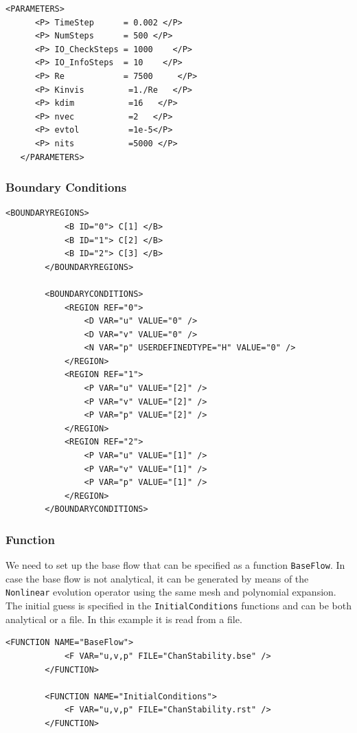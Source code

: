     \begin{lstlisting}[style=XMLStyle]
<PARAMETERS>
      <P> TimeStep      = 0.002 </P>
      <P> NumSteps      = 500 </P>
      <P> IO_CheckSteps = 1000    </P>
      <P> IO_InfoSteps  = 10    </P>
      <P> Re            = 7500     </P>
      <P> Kinvis         =1./Re   </P>
      <P> kdim           =16   </P>
      <P> nvec           =2   </P>
      <P> evtol          =1e-5</P>
      <P> nits           =5000 </P>
   </PARAMETERS>
         \end{lstlisting}


\subsubsection{Boundary Conditions}

    \begin{lstlisting}[style=XMLStyle]
 <BOUNDARYREGIONS>
            <B ID="0"> C[1] </B>
            <B ID="1"> C[2] </B>
            <B ID="2"> C[3] </B>
        </BOUNDARYREGIONS>

        <BOUNDARYCONDITIONS>
            <REGION REF="0">
                <D VAR="u" VALUE="0" />
                <D VAR="v" VALUE="0" />
                <N VAR="p" USERDEFINEDTYPE="H" VALUE="0" />
            </REGION>
            <REGION REF="1">
                <P VAR="u" VALUE="[2]" />
                <P VAR="v" VALUE="[2]" />
                <P VAR="p" VALUE="[2]" />
            </REGION>
            <REGION REF="2">
                <P VAR="u" VALUE="[1]" />
                <P VAR="v" VALUE="[1]" />
                <P VAR="p" VALUE="[1]" />
            </REGION>
        </BOUNDARYCONDITIONS>
                 \end{lstlisting}

\subsubsection{Function}

We need to set up the base flow that can be specified as a function \texttt{BaseFlow}. In case the base flow is not analytical, it can be generated by means of the \texttt{Nonlinear} evolution operator using the same mesh and polynomial expansion. The initial guess is specified in the \texttt{InitialConditions} functions and can be both analytical or a file. In this example it is read from a file.

    \begin{lstlisting}[style=XMLStyle]
<FUNCTION NAME="BaseFlow">
            <F VAR="u,v,p" FILE="ChanStability.bse" />
        </FUNCTION>

        <FUNCTION NAME="InitialConditions">
            <F VAR="u,v,p" FILE="ChanStability.rst" />
        </FUNCTION>
                         \end{lstlisting}



